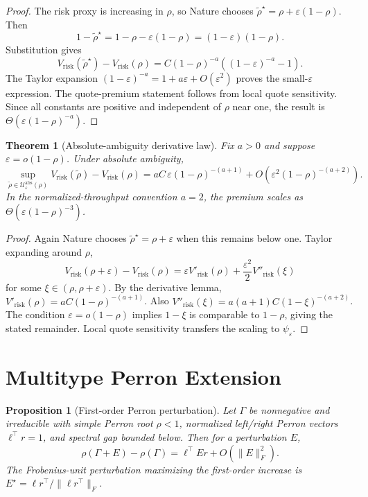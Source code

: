 \documentclass[11pt]{article}
\newtheorem{proposition}{Proposition}
\newtheorem{theorem}{Theorem}
\newcommand{\eps}{\varepsilon}
\begin{document}
\begin{proof}
The risk proxy is increasing in $\rho$, so Nature chooses
$\tilde\rho^\star=\rho+\eps(1-\rho)$. Then
\[
1-\tilde\rho^\star = 1-\rho-\eps(1-\rho)=(1-\eps)(1-\rho).
\]
Substitution gives
\[
V_{\mathrm{risk}}(\tilde\rho^\star)-V_{\mathrm{risk}}(\rho)
=C(1-\rho)^{-a}\left((1-\eps)^{-a}-1\right).
\]
The Taylor expansion
$(1-\eps)^{-a}=1+a\eps+O(\eps^2)$ proves the small-$\eps$ expression. The
quote-premium statement follows from local quote sensitivity. Since all
constants are positive and independent of $\rho$ near one, the result is
$\Theta(\eps(1-\rho)^{-a})$.
\end{proof}

\begin{theorem}[Absolute-ambiguity derivative law]
Fix $a>0$ and suppose $\eps=o(1-\rho)$. Under absolute ambiguity,
\[
\sup_{\tilde\rho\in\mathcal U^{\mathrm{abs}}_\eps(\rho)}
V_{\mathrm{risk}}(\tilde\rho)-V_{\mathrm{risk}}(\rho)
=aC\,\eps(1-\rho)^{-(a+1)}
+O(\eps^2(1-\rho)^{-(a+2)}).
\]
In the normalized-throughput convention $a=2$, the premium scales as
$\Theta(\eps(1-\rho)^{-3})$.
\end{theorem}

\begin{proof}
Again Nature chooses $\tilde\rho^\star=\rho+\eps$ when this remains below one.
Taylor expanding around $\rho$,
\[
V_{\mathrm{risk}}(\rho+\eps)-V_{\mathrm{risk}}(\rho)
=\eps V'_{\mathrm{risk}}(\rho)
+\frac{\eps^2}{2}V''_{\mathrm{risk}}(\xi)
\]
for some $\xi\in(\rho,\rho+\eps)$. By the derivative lemma,
$V'_{\mathrm{risk}}(\rho)=aC(1-\rho)^{-(a+1)}$. Also
$V''_{\mathrm{risk}}(\xi)=a(a+1)C(1-\xi)^{-(a+2)}$. The condition
$\eps=o(1-\rho)$ implies $1-\xi$ is comparable to $1-\rho$, giving the stated
remainder. Local quote sensitivity transfers the scaling to $\psi_\eps$.
\end{proof}

\section{Multitype Perron Extension}

\begin{proposition}[First-order Perron perturbation]
Let $\Gamma$ be nonnegative and irreducible with simple Perron root
$\rho<1$, normalized left/right Perron vectors $\ell^\top r=1$, and spectral
gap bounded below. Then for a perturbation $E$,
\[
\rho(\Gamma+E)-\rho(\Gamma)=\ell^\top E r+O(\|E\|_F^2).
\]
The Frobenius-unit perturbation maximizing the first-order increase is
$E^\star = \ell r^\top/\|\ell r^\top\|_F$.
\end{proposition}
\end{document}
